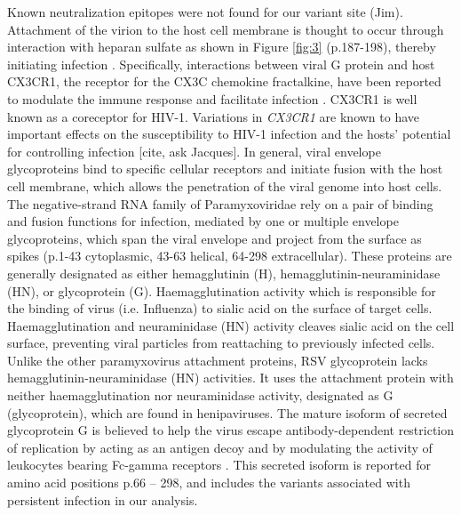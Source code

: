 \documentclass{article}
\begin{document}
Known neutralization epitopes were not found for our variant site (Jim).
Attachment of the virion to the host cell membrane is thought to occur through interaction with heparan sulfate as shown in Figure \ref{fig:3}
(p.187-198), thereby initiating infection 
\cite{levine1987demonstration, feldman1999identification, feldman2000fusion}.
Specifically, interactions between viral G protein and host CX3CR1, the receptor for the CX3C chemokine fractalkine, have been reported to modulate the immune response and facilitate infection 
\cite{johnson2015respiratory, tripp2001cx3c, jeong2015cx3cr1}.
CX3CR1 is well known as a coreceptor for HIV-1. 
Variations in \textit{CX3CR1} are known to have important effects on the susceptibility to HIV-1 infection and the hosts' potential for controlling infection [cite, ask Jacques].
In general, viral envelope glycoproteins bind to specific cellular receptors and initiate fusion with the host cell membrane, 
which allows the penetration of the viral genome into host cells. 
The negative-strand RNA family of Paramyxoviridae rely on a pair of binding and fusion functions for infection, mediated by one or multiple envelope glycoproteins,
which span the viral envelope and project from the surface as spikes 
(p.1-43 cytoplasmic, 43-63 helical, 64-298 extracellular).
These proteins are generally designated as either hemagglutinin (H), hemagglutinin-neuraminidase (HN), or glycoprotein (G). 
Haemagglutination activity which is responsible for the binding of virus (i.e. Influenza) to sialic acid on the surface of target cells.
Haemagglutination and neuraminidase (HN) activity cleaves sialic acid on the cell surface, preventing viral particles from reattaching to previously infected cells. 
Unlike the other paramyxovirus attachment proteins, 
RSV glycoprotein lacks hemagglutinin-neuraminidase (HN) activities.
It uses the attachment protein with neither haemagglutination nor neuraminidase activity, designated as G (glycoprotein), which are found in henipaviruses.
\cite{takimoto2002role, malvoisin1993measles, hu1992functional, horvath1992biological, bousse1994regions}
The mature isoform of secreted glycoprotein G is believed to help the virus escape antibody-dependent restriction of replication by acting as an antigen decoy and by modulating the activity of leukocytes bearing Fc-gamma receptors 
\cite{bukreyev2008secreted}.
This secreted isoform is reported for amino acid positions p.66 – 298, and includes the variants associated with persistent infection in our analysis. 
\end{document}
